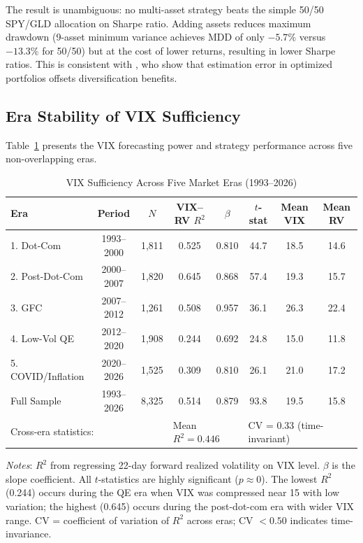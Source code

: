 \documentclass[12pt,a4paper]{article}
\begin{document}
The result is unambiguous: no multi-asset strategy beats the simple 50/50 SPY/GLD allocation on Sharpe ratio. Adding assets reduces maximum drawdown (9-asset minimum variance achieves MDD of only $-5.7\%$ versus $-13.3\%$ for 50/50) but at the cost of lower returns, resulting in lower Sharpe ratios. This is consistent with \citet{demiguel2009}, who show that estimation error in optimized portfolios offsets diversification benefits.

\subsection{Era Stability of VIX Sufficiency}

Table~\ref{tab:era_stability} presents the VIX forecasting power and strategy performance across five non-overlapping eras.

\begin{table}[H]
\centering
\small
\begin{threeparttable}
\caption{VIX Sufficiency Across Five Market Eras (1993--2026)}
\label{tab:era_stability}
\begin{tabular}{@{}lccccccc@{}}
\toprule
Era & Period & $N$ & VIX--RV $R^2$ & $\beta$ & $t$-stat & Mean VIX & Mean RV \\
\midrule
1. Dot-Com & 1993--2000 & 1,811 & 0.525 & 0.810 & 44.7 & 18.5 & 14.6 \\
2. Post-Dot-Com & 2000--2007 & 1,820 & 0.645 & 0.868 & 57.4 & 19.3 & 15.7 \\
3. GFC & 2007--2012 & 1,261 & 0.508 & 0.957 & 36.1 & 26.3 & 22.4 \\
4. Low-Vol QE & 2012--2020 & 1,908 & 0.244 & 0.692 & 24.8 & 15.0 & 11.8 \\
5. COVID/Inflation & 2020--2026 & 1,525 & 0.309 & 0.810 & 26.1 & 21.0 & 17.2 \\
\midrule
Full Sample & 1993--2026 & 8,325 & 0.514 & 0.879 & 93.8 & 19.5 & 15.8 \\
\midrule
\multicolumn{3}{l}{Cross-era statistics:} & \multicolumn{2}{l}{Mean $R^2 = 0.446$} & \multicolumn{3}{l}{CV = 0.33 (time-invariant)} \\
\bottomrule
\end{tabular}
\begin{tablenotes}
\small
\item \textit{Notes}: $R^2$ from regressing 22-day forward realized volatility on VIX level. $\beta$ is the slope coefficient. All $t$-statistics are highly significant ($p \approx 0$). The lowest $R^2$ (0.244) occurs during the QE era when VIX was compressed near 15 with low variation; the highest (0.645) occurs during the post-dot-com era with wider VIX range. CV = coefficient of variation of $R^2$ across eras; CV $< 0.50$ indicates time-invariance.
\end{tablenotes}
\end{threeparttable}
\end{table}
\end{document}
